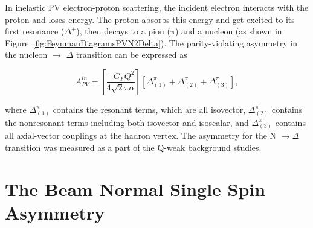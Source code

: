 
In inelastic PV electron-proton scattering, the incident electron interacts with the proton and loses energy. The proton absorbs this energy and get excited to its first resonance ($\Delta^{+}$), then decays to a pion ($\pi$) and a nucleon (as shown in Figure~\ref{fig:FeynmanDiagramsPVN2Delta}).
The parity-violating asymmetry in the nucleon $\rightarrow$ $\Delta$ transition can be expressed as~\cite{Mukhopadhyay1998481,PhysRevD.65.033001}

\begin{equation} \label{equ:qweak16}
A_{PV}^{in} = \left[ \frac{-G_{F}Q^{2}}{4 \sqrt{2}\pi\alpha} \right] \left[ \Delta_{(1)}^{\pi} + \Delta_{(2)}^{\pi} + \Delta_{(3)}^{\pi} \right],
\end{equation}

\noindent
where $\Delta_{(1)}^{\pi}$ contains the resonant terms, which are all isovector, $\Delta_{(2)}^{\pi}$ contains the nonresonant terms including both isovector and isoscalar, and $\Delta_{(3)}^{\pi}$ contains all axial-vector couplings at the hadron vertex.
The asymmetry for the N $\rightarrow \Delta$ transition was measured as a part of the Q-weak background studies. 


\section{The Beam Normal Single Spin Asymmetry}%
\label{The Beam Normal Single Spin Asymmetry}

